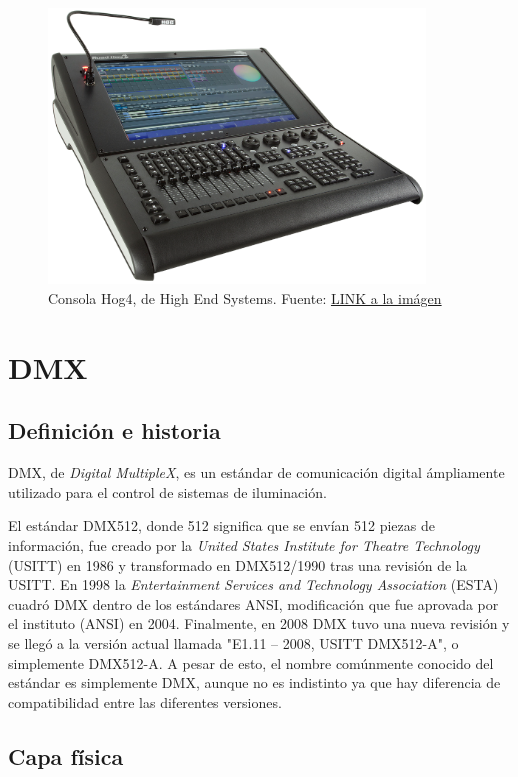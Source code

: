 \begin{figure}[!ht]
	\centering
	\includegraphics[width=10cm,scale=1]{resources/1_5-consolaHOG.png}
	\caption{Consola Hog4, de High End Systems. Fuente: \href{https://www.highend.com/products/consoles}{LINK a la imágen}}
	\label{fig:\thefigure}
\end{figure}

 

\section{DMX}
\subsection{Definición e historia}
DMX, de \textit{Digital MultipleX}, es un estándar de comunicación digital ámpliamente utilizado para el control de sistemas de iluminación. 

El estándar DMX512, donde 512 significa que se envían 512 piezas de información, fue creado por la \textit{United States Institute for Theatre Technology} (USITT) en 1986 y transformado en DMX512/1990 tras una revisión de la USITT. En 1998 la \textit{Entertainment Services and Technology Association} (ESTA) cuadró DMX dentro de los estándares ANSI, modificación que fue aprovada por el instituto (ANSI) en 2004. Finalmente, en 2008 DMX tuvo una nueva revisión y se llegó a la versión actual llamada "E1.11 – 2008, USITT DMX512-A", o simplemente DMX512-A. A pesar de esto, el nombre comúnmente conocido del estándar es simplemente DMX, aunque no es indistinto ya que hay diferencia de compatibilidad entre las diferentes versiones.


\subsection{Capa física}
